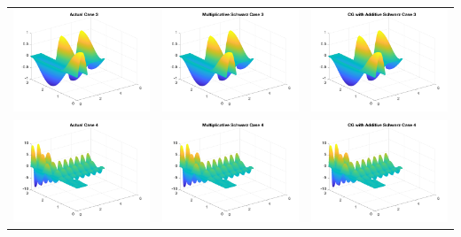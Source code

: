 \documentclass[11pt]{article}
\theoremstyle{definition}
\theoremstyle{remark}
\theoremstyle{plain}
\begin{document}
\begin{center}
\begin{tabular}{ccc}
    \includegraphics[width=0.3\linewidth]{../Figures/final_3_actual_3.png}&\includegraphics[width=0.3\linewidth]{../Figures/final_3_mult_3.png}&\includegraphics[width=0.3\linewidth]{../Figures/final_3_pcg_3.png}\\
    \includegraphics[width=0.3\linewidth]{../Figures/final_3_actual_4.png}&\includegraphics[width=0.3\linewidth]{../Figures/final_3_mult_4.png}&\includegraphics[width=0.3\linewidth]{../Figures/final_3_pcg_4.png}\\

\end{tabular}
\end{center}
\end{document}
